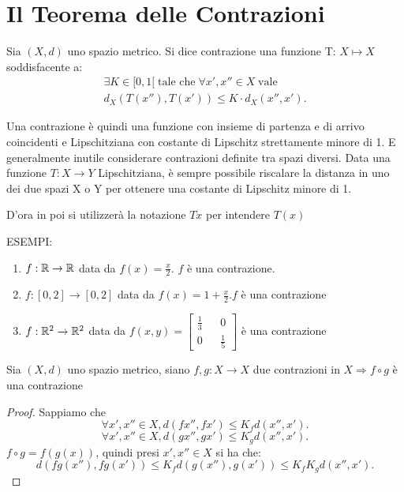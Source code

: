 \section{Il Teorema delle Contrazioni}
\begin{definition}[Contrazione]
	\label{def:contrazione}
	Sia $(X, d)$ uno spazio metrico. Si dice contrazione una funzione T: $X \mapsto X$ soddisfacente a:
	\begin{align}
		\label{eq:def_contrazione}
		\exists K \in [0, 1[\;\text{tale che}\;\forall x',x''\in X\;\text{vale}\\
		d_X(T(x''), T(x')) \le K \cdot d_X(x'', x').
	\end{align}


	Una contrazione è quindi una funzione con insieme di partenza e di arrivo coincidenti e
	Lipschitziana con costante di Lipschitz strettamente minore di 1.
	E generalmente inutile considerare contrazioni definite tra spazi diversi. Data una funzione
	$T: X\rightarrow Y$ Lipschitziana, è sempre possibile riscalare la distanza in uno dei due spazi X o Y
	per ottenere una costante di Lipschitz minore di 1.
	\begin{note}
		D'ora in poi si utilizzerà la notazione $Tx$ per intendere $T(x)$
	\end{note}
\end{definition}

ESEMPI:\\
\begin{enumerate}
	\item $f: \mathbb{R} \rightarrow \mathbb{R}$ data da $f(x) = \frac{x}{2}$. $f$ è una contrazione.
	\item $f: [0,2] \rightarrow [0,2]$ data da $f(x) = 1+\frac{x}{2}. f$ è una contrazione
	\item $f: \mathbb{R}^2 \rightarrow \mathbb{R}^2$ data da $f(x,y)=\begin{bmatrix} \frac{1}{3}&&0\\0&&\frac{1}{5}\end{bmatrix}$ è una contrazione
\end{enumerate}

\proposition
Sia $(X, d)$ uno spazio metrico, siano $f,g:X\rightarrow X$ due contrazioni in $X \Rightarrow f\circ g$ è una contrazione
\begin{proof}
	Sappiamo che\\
	$$\forall x',x''\in X, d(fx'', fx')\le K_fd(x'', x').$$
	$$\forall x',x''\in X, d(gx'', gx')\le K_gd(x'', x').$$
	$f\circ g=f(g(x))$, quindi presi $x',x''\in X$ si ha che: $$d(fg(x''), fg(x'))\le K_fd(g(x''), g(x'))\le K_fK_gd(x'',x').$$
\end{proof}

